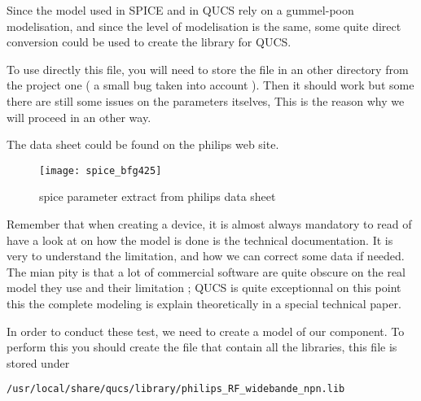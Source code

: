 \bigskip




Since the model used in SPICE and in QUCS rely on a gummel-poon modelisation, and since the level of modelisation is the same, some quite direct conversion could be used to create the library for QUCS.

To use directly this file, you will need to store the file in an other directory from the project one ( a small bug taken into account ). Then it should work but some there are still some issues on the parameters itselves, This is the reason why we will proceed in an other way.

The data sheet could be found on the philips web site. 

\begin{figure}[htbp]
\begin{center}
\texttt{[image: spice\_bfg425]}
\caption{spice parameter extract from philips data sheet}
\label{design:pa:spiceDatasheet}
\end{center}
\end{figure}



Remember that when creating a device, it is almost always mandatory to read of have a look at on how the model is done is the technical documentation. It is very to understand the limitation, and how we can correct some data if needed. The mian pity is that a lot of commercial software are quite obscure on the real model they use and their limitation ; QUCS is quite exceptionnal  on this point this the complete modeling is explain theoretically in a special technical paper.

\bigskip

In order to conduct these test, we need to create a model of our component. To perform this you should create the file that contain all the libraries, this file is stored under 

\begin{verbatim}
/usr/local/share/qucs/library/philips_RF_widebande_npn.lib
\end{verbatim}

